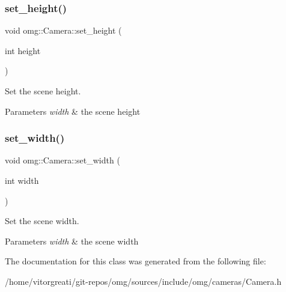 \subsubsection{\texorpdfstring{set\_height()}{set\_height()}}
{\footnotesize\ttfamily void omg\+::\+Camera\+::set\+\_\+height (\begin{DoxyParamCaption}\item[{int}]{height }\end{DoxyParamCaption})\hspace{0.3cm}{\ttfamily [inline]}}



Set the scene height. 


\begin{DoxyParams}{Parameters}
{\em width} & the scene height \\
\hline
\end{DoxyParams}
\mbox{\label{classomg_1_1_camera_a3ef1ff0d4ca0deb6b32b5e08d7dcb159}} 
\subsubsection{\texorpdfstring{set\_width()}{set\_width()}}
{\footnotesize\ttfamily void omg\+::\+Camera\+::set\+\_\+width (\begin{DoxyParamCaption}\item[{int}]{width }\end{DoxyParamCaption})\hspace{0.3cm}{\ttfamily [inline]}}



Set the scene width. 


\begin{DoxyParams}{Parameters}
{\em width} & the scene width \\
\hline
\end{DoxyParams}


The documentation for this class was generated from the following file\+:\begin{DoxyCompactItemize}
\item 
/home/vitorgreati/git-\/repos/omg/sources/include/omg/cameras/Camera.\+h\end{DoxyCompactItemize}
